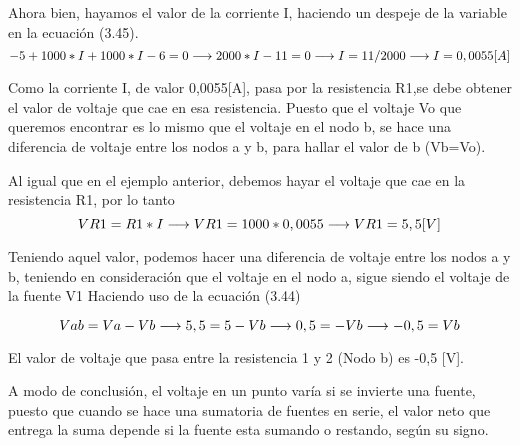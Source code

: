\begin{example}
        Ahora bien, hayamos el valor de la corriente I, haciendo un despeje de la variable en la ecuación (3.45).
        \begin{equation*}
        \notag
        -5 +1000*I +1000*I -6 =0
        \longrightarrow
        2000*I -11=0
        \longrightarrow
        I =11/2000
        \longrightarrow
        I=0,0055 [A]
        \end{equation*}

        Como la corriente I, de valor 0,0055[A], pasa por la resistencia R1,se debe obtener el valor de voltaje que cae en esa resistencia. Puesto que el voltaje Vo que queremos encontrar es lo mismo que el voltaje en el nodo b, se hace una diferencia de voltaje entre los nodos a y b, para hallar el valor de b (Vb=Vo).

        Al igual que en el ejemplo anterior, debemos hayar el voltaje que cae en la resistencia R1, por lo tanto
        \begin{equation*}
        \notag
        VR1=R1*I
        \longrightarrow
        VR1=1000*0,0055
        \longrightarrow
        VR1=5,5[V]
        \end{equation*}

        Teniendo aquel valor, podemos hacer una diferencia de voltaje entre los nodos a y b, teniendo en consideración que el voltaje en el nodo a, sigue siendo el voltaje de la fuente V1
        \newpage
        Haciendo uso de la ecuación (3.44)

        \begin{equation*}
        \notag
        Vab=Va-Vb
        \longrightarrow
        5,5=5-Vb
        \longrightarrow
        0,5=-Vb
        \longrightarrow
        -0,5=Vb
        \end{equation*}

        El valor de voltaje que pasa entre la resistencia 1 y 2 (Nodo b) es -0,5 [V].

        A modo de conclusión, el voltaje en un punto varía si se invierte una fuente, puesto que cuando se hace una sumatoria de fuentes en serie, el valor neto que entrega la suma depende si la fuente esta sumando o restando, según su signo.
    \end{example}
    \newpage


